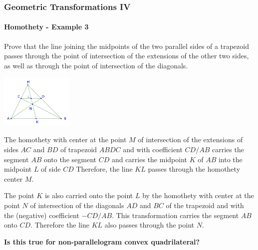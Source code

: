 \documentclass[8pt,xcolor=table,dvipsnames]{beamer}
\begin{document}
\begin{frame}[t]
    \frametitle{Geometric Transformations IV}
    \framesubtitle{Homothety - Example 3}
    \begin{example}
        Prove that the line joining the midpoints of the two parallel sides of a trapezoid passes through the point of intersection of the extensions of the other two sides,
        as well as through the point of intersection of the diagonals.
    \end{example}
    \begin{center}
        \includegraphics[width=3.5cm]{./svg/pdf/homothety-p3b.pdf}
    \end{center}
    The homothety with center at the point $M$ of intersection of the extensions of sides $AC$ and $BD$ of trapezoid $ABDC$
    and with coefficient $CD/AB$ carries the segment $AB$ onto the segment $CD$ and carries the midpoint $K$ of $AB$ into the midpoint $L$ of side $CD$
    Therefore, the line $KL$ passes through the homothety center $M$.

    The point $K$ is also carried onto the point $L$ by the homothety with center at the point $N$ of intersection of the diagonals $AD$ and $BC$ of the trapezoid
    and with the (negative) coefficient $-CD/AB$. This transformation carries the segment $AB$ onto $CD$. Therefore the line $KL$ also passes through
    the point $N.$

    \textbf{Is this true for non-parallelogram convex quadrilateral?} 
\end{frame}
\end{document}
